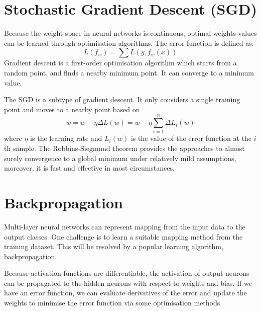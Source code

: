 \section{Stochastic Gradient Descent (SGD)}

Because the weight space in neural networks is continuous, optimal weights values can be learned through optimisation algorithms. The error function is defined as:
\begin{equation}\label{eq:LossMin}
L(f_{w}) = \sum L(y, f_{w}(x))
\end{equation}
Gradient descent is a first-order optimisation algorithm which starts from a random point, and finds a nearby minimum point. It can converge to a minimum value.

The SGD is a subtype of gradient descent. It only considers a single training point and moves to a nearby point based on
\begin{equation}\label{eq:SGDUpdate}
w = w - \eta  \Delta L(w) = w - \eta \sum_{i=1}^{n} \Delta L_{i}(w)
\end{equation}
where $\eta$ is the learning rate and $L_{i}(w)$ is the value of the error function at the $i$th sample. The Robbins-Siegmund theorem \citep{robbins1985convergence} provides the approaches to almost surely convergence to a global minimum under relatively mild assumptions, moreover, it is fast and effective in most circumstances.

\section{Backpropagation}

Multi-layer neural networks can represent mapping from the input data to the output classes. One challenge is to learn a suitable mapping method from the training dataset. This will be resolved by a popular learning algorithm, backpropagation.

Because activation functions are differentiable, the activation of output neurons can be propagated to the hidden neurons with respect to weights and bias. If we have an error function, we can evaluate derivatives of the error and update the weights to minimise the error function via some optimisation methods.

